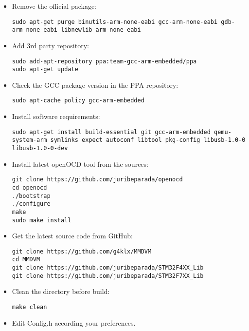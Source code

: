 \documentclass[]{article}
\begin{document}
\begin{itemize}[leftmargin=*]
	
\item Remove the official package:
\begin{lstlisting}[style=DOS]
sudo apt-get purge binutils-arm-none-eabi gcc-arm-none-eabi gdb-arm-none-eabi libnewlib-arm-none-eabi
\end{lstlisting}

\item Add 3rd party repository:
\begin{lstlisting}[style=DOS]
sudo add-apt-repository ppa:team-gcc-arm-embedded/ppa
sudo apt-get update
\end{lstlisting}

\item Check the GCC package version in the PPA repository:
\begin{lstlisting}[style=DOS]
sudo apt-cache policy gcc-arm-embedded
\end{lstlisting}

\item Install software requirements:
\begin{lstlisting}[style=DOS]
sudo apt-get install build-essential git gcc-arm-embedded qemu-system-arm symlinks expect autoconf libtool pkg-config libusb-1.0-0 libusb-1.0-0-dev
\end{lstlisting}

\item Install latest openOCD tool from the sources:
\begin{lstlisting}[style=DOS]
git clone https://github.com/juribeparada/openocd
cd openocd
./bootstrap
./configure
make
sudo make install
\end{lstlisting}
	
\item Get the latest source code from GitHub:
\begin{lstlisting}[style=DOS]
git clone https://github.com/g4klx/MMDVM
cd MMDVM
git clone https://github.com/juribeparada/STM32F4XX_Lib
git clone https://github.com/juribeparada/STM32F7XX_Lib
\end{lstlisting}
	
\item Clean the directory before build:
\begin{lstlisting}[style=DOS]
make clean
\end{lstlisting}
	
\item Edit Config.h according your preferences.
	

\end{itemize}
\end{document}
